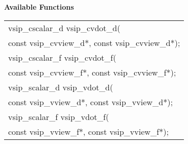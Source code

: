 \\\cvsiplh
\\ \hspace*{.8cm} \vspace*{.1cm} \textbf{Available Functions }
\\ \hspace*{0.03\textwidth} {
\ttfamily
\begin{tabular}[H]{l}
vsip\_cscalar\_d vsip\_cvdot\_d(\\*\hspace{.6cm}const vsip\_cvview\_d*, const vsip\_cvview\_d*);\\
vsip\_cscalar\_f vsip\_cvdot\_f(\\*\hspace{.6cm}const vsip\_cvview\_f*, const vsip\_cvview\_f*);\\
vsip\_scalar\_d vsip\_vdot\_d(\\*\hspace{.6cm}const vsip\_vview\_d*, const vsip\_vview\_d*);\\
vsip\_scalar\_f vsip\_vdot\_f(\\*\hspace{.6cm}const vsip\_vview\_f*, const vsip\_vview\_f*);\\
\end{tabular}
}
\\\pyjvsiph
